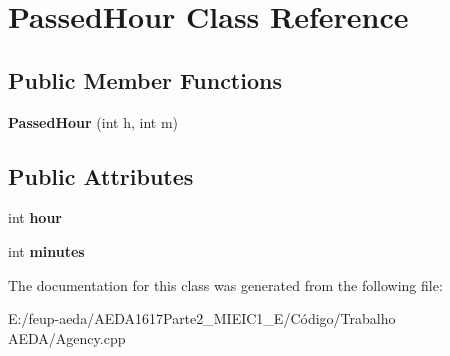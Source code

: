 \hypertarget{class_passed_hour}{}\section{Passed\+Hour Class Reference}
\label{class_passed_hour}
\subsection*{Public Member Functions}
\begin{DoxyCompactItemize}
\item 
\mbox{\label{class_passed_hour_aebd27de85dd95fde6655fd2037356f84}} 
{\bfseries Passed\+Hour} (int h, int m)
\end{DoxyCompactItemize}
\subsection*{Public Attributes}
\begin{DoxyCompactItemize}
\item 
\mbox{\label{class_passed_hour_a07abcad6d6d0d5d3fa5a5fe7981d52b7}} 
int {\bfseries hour}
\item 
\mbox{\label{class_passed_hour_ab371a82e5e3cc1219630cc6c32cb0daa}} 
int {\bfseries minutes}
\end{DoxyCompactItemize}


The documentation for this class was generated from the following file\+:\begin{DoxyCompactItemize}
\item 
E\+:/feup-\/aeda/\+A\+E\+D\+A1617\+Parte2\+\_\+M\+I\+E\+I\+C1\+\_\+\+E/\+Código/\+Trabalho A\+E\+D\+A/Agency.\+cpp\end{DoxyCompactItemize}
